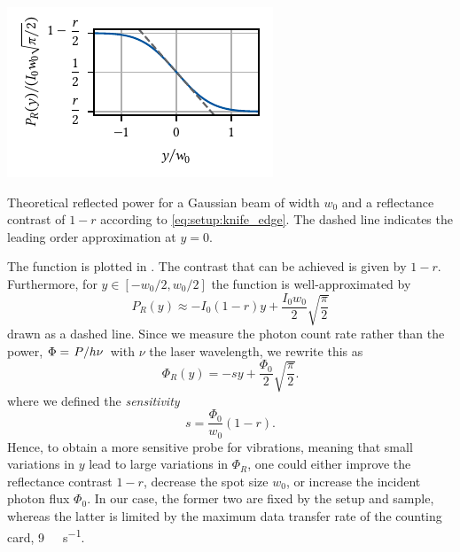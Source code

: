 \begin{marginfigure}
    \centering
    \includegraphics{img/pdf/setup/knife_edge_theory}
    \caption[]{
        Theoretical reflected power for a Gaussian beam of width $w_0$ and a reflectance contrast of $1-r$ according to \cref{eq:setup:knife_edge}.
        The dashed line indicates the leading order approximation at $y=0$.
    }
    \label{fig:setup:vibrations:knife_edge:theory}
\end{marginfigure}

The function is plotted in .
The contrast that can be achieved is given by $1-r$.
Furthermore, for $y\in[-w_0/2, w_0/2]$ the function is well-approximated by
\begin{equation}\label{eq:setup:knife_edge:approx}
    P_R(y)\approx -I_0(1-r)y + \frac{I_0 w_0}{2}\sqrt{\frac{\pi}{2}}
\end{equation}
drawn as a dashed line.
Since we measure the photon count rate rather than the power, $\Phi = \flatfrac{P}{h\nu}$ with $\nu$ the laser wavelength, we rewrite this as
\begin{equation}\label{eq:setup:knife_edge:linearized}
    \Phi_R(y) = -sy + \frac{\Phi_0}{2}\sqrt{\frac{\pi}{2}}.%
\end{equation}
where we defined the \emph{sensitivity}
\begin{equation}\label{eq:setup:knife_edge:sensitivity}
    s = \frac{\Phi_0}{w_0}(1 - r).
\end{equation}
Hence, to obtain a more sensitive probe for vibrations, meaning that small variations in $y$ lead to large variations in $\Phi_R$, one could either improve the reflectance contrast $1-r$, decrease the spot size $w_0$, or increase the incident photon flux $\Phi_0$.
In our case, the former two are fixed by the setup and sample, whereas the latter is limited by the maximum data transfer rate of the \tagger counting card, \qty{9}{\mega\sample\per\second}.

